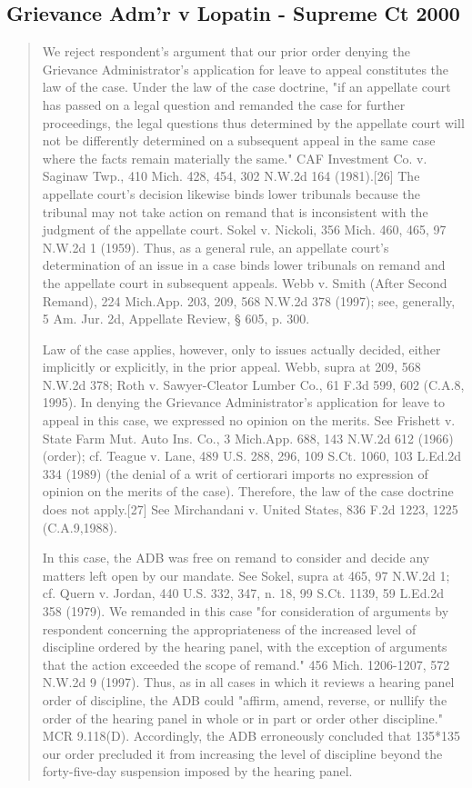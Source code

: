 \documentclass[12pt,\documentclassflag]{michiganCourtOfAppealsBrief}
\begin{document}
\subsection{Grievance Adm'r v Lopatin - Supreme Ct 2000}

\begin{quotation}
  We reject respondent's argument that our prior order denying the Grievance Administrator's application for leave to appeal constitutes the law of the case. Under the law of the case doctrine, "if an appellate court has passed on a legal question and remanded the case for further proceedings, the legal questions thus determined by the appellate court will not be differently determined on a subsequent appeal in the same case where the facts remain materially the same." CAF Investment Co. v. Saginaw Twp., 410 Mich. 428, 454, 302 N.W.2d 164 (1981).[26] The appellate court's decision likewise binds lower tribunals because the tribunal may not take action on remand that is inconsistent with the judgment of the appellate court. Sokel v. Nickoli, 356 Mich. 460, 465, 97 N.W.2d 1 (1959). Thus, as a general rule, an appellate court's determination of an issue in a case binds lower tribunals on remand and the appellate court in subsequent appeals. Webb v. Smith (After Second Remand), 224 Mich.App. 203, 209, 568 N.W.2d 378 (1997); see, generally, 5 Am. Jur. 2d, Appellate Review, § 605, p. 300.

Law of the case applies, however, only to issues actually decided, either implicitly or explicitly, in the prior appeal. Webb, supra at 209, 568 N.W.2d 378; Roth v. Sawyer-Cleator Lumber Co., 61 F.3d 599, 602 (C.A.8, 1995). In denying the Grievance Administrator's application for leave to appeal in this case, we expressed no opinion on the merits. See Frishett v. State Farm Mut. Auto Ins. Co., 3 Mich.App. 688, 143 N.W.2d 612 (1966) (order); cf. Teague v. Lane, 489 U.S. 288, 296, 109 S.Ct. 1060, 103 L.Ed.2d 334 (1989) (the denial of a writ of certiorari imports no expression of opinion on the merits of the case). Therefore, the law of the case doctrine does not apply.[27] See Mirchandani v. United States, 836 F.2d 1223, 1225 (C.A.9,1988).

In this case, the ADB was free on remand to consider and decide any matters left open by our mandate. See Sokel, supra at 465, 97 N.W.2d 1; cf. Quern v. Jordan, 440 U.S. 332, 347, n. 18, 99 S.Ct. 1139, 59 L.Ed.2d 358 (1979). We remanded in this case "for consideration of arguments by respondent concerning the appropriateness of the increased level of discipline ordered by the hearing panel, with the exception of arguments that the action exceeded the scope of remand." 456 Mich. 1206-1207, 572 N.W.2d 9 (1997). Thus, as in all cases in which it reviews a hearing panel order of discipline, the ADB could "affirm, amend, reverse, or nullify the order of the hearing panel in whole or in part or order other discipline." MCR 9.118(D). Accordingly, the ADB erroneously concluded that 135*135 our order precluded it from increasing the level of discipline beyond the forty-five-day suspension imposed by the hearing panel.
\end{quotation}
\end{document}
